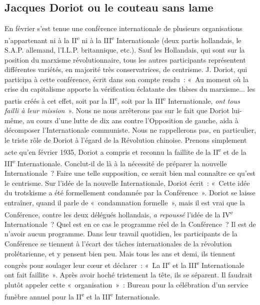 \documentclass[french,twoside]{book} %
\begin{document}
\subsection[{Jacques Doriot ou le couteau sans lame}]{Jacques Doriot ou le couteau sans lame}
\noindent En février s’est tenue une conférence internationale de plusieurs organisations n’appartenant ni à la II\textsuperscript{e} ni à la III\textsuperscript{e} Internationale (deux partis hollandais, le S.A.P. allemand, l’I.L.P. britannique, etc.). Sauf les Hollandais, qui sont sur la position du marxisme révolutionnaire, tous les autres participants représentent différentes variétés, en majorité très conservatrices, de centrisme. J. Doriot, qui participa à cette conférence, écrit dans son compte rendu : « Au moment où la crise du capitalisme apporte la vérification  éclatante des thèses du marxisme... les partis créés à cet effet, soit par la II\textsuperscript{e}, soit par la III\textsuperscript{e} Internationale, \emph{ont tous failli à leur mission} ». Nous ne nous arrêterons pas sur le fait que Doriot lui-même, au cours d’une lutte de dix ans contre l’Opposition de gauche, aida à décomposer l’Internationale communiste. Nous ne rappellerons pas, en particulier, le triste rôle de Doriot à l’égard de la Révolution chinoise. Prenons simplement acte qu’en février 1935, Doriot a compris et reconnu la faillite de la II\textsuperscript{e} et de la III\textsuperscript{e} Internationale. Conclut-il de là à la nécessité de préparer la nouvelle Internationale ? Faire une telle supposition, ce serait bien mal connaître ce qu’est le centrisme. Sur l’idée de la nouvelle Internationale, Doriot écrit : « Cette idée du trotskisme a été formellement condamnée par la Conférence ». Doriot se laisse entraîner, quand il parle de « condamnation formelle », mais il est vrai que la Conférence, contre les deux délégués hollandais, \emph{a repoussé} l’idée de la IV\textsuperscript{e} Internationale ? Quel est en ce cas le programme réel de la Conférence ? Il est de n’avoir aucun programme. Dans leur travail quotidien, les participants de la Conférence se tiennent à l’écart des tâches internationales de la révolution prolétarienne, et y pensent bien peu. Mais tous les ans et demi, ils tiennent congrès pour soulager leur cœur et déclarer : « La II\textsuperscript{e} et la III\textsuperscript{e} Internationale ont fait faillite ». Après avoir hoché tristement la tête, ils se séparent. Il faudrait plutôt appeler cette « organisation » : Bureau pour la célébration d’un service funèbre annuel pour la II\textsuperscript{e} et la III\textsuperscript{e} Internationale.\par
\end{document}
